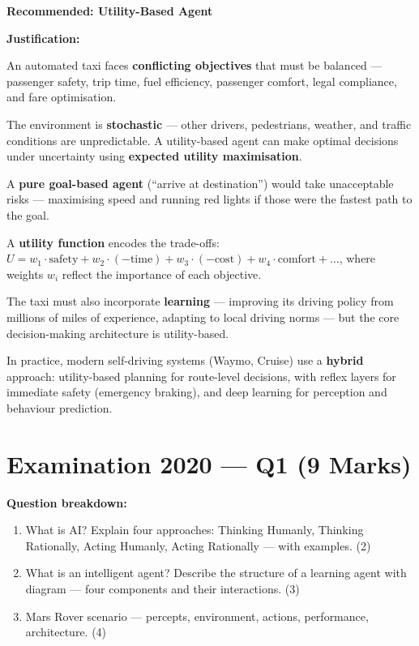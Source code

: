 \documentclass[12pt, a4paper]{article}
\newenvironment{solutionbox}{\begin{mdframed}[style=solutionframe]}{\end{mdframed}}
\newenvironment{answerbox}{\begin{mdframed}[style=answerframe]}{\end{mdframed}}
\begin{document}
\begin{answerbox}
\textbf{Recommended: Utility-Based Agent}

\noindent\textbf{Justification:}
\begin{keypoints}
  \item An automated taxi faces \textbf{conflicting objectives} that must be balanced — passenger safety, trip time, fuel efficiency, passenger comfort, legal compliance, and fare optimisation.
  \item The environment is \textbf{stochastic} — other drivers, pedestrians, weather, and traffic conditions are unpredictable. A utility-based agent can make optimal decisions under uncertainty using \textbf{expected utility maximisation}.
  \item A \textbf{pure goal-based agent} (``arrive at destination'') would take unacceptable risks — maximising speed and running red lights if those were the fastest path to the goal.
  \item A \textbf{utility function} encodes the trade-offs: $U = w_1 \cdot \text{safety} + w_2 \cdot (-\text{time}) + w_3 \cdot (-\text{cost}) + w_4 \cdot \text{comfort} + \ldots$, where weights $w_i$ reflect the importance of each objective.
  \item The taxi must also incorporate \textbf{learning} — improving its driving policy from millions of miles of experience, adapting to local driving norms — but the core decision-making architecture is utility-based.
\end{keypoints}

\noindent In practice, modern self-driving systems (Waymo, Cruise) use a \textbf{hybrid} approach: utility-based planning for route-level decisions, with reflex layers for immediate safety (emergency braking), and deep learning for perception and behaviour prediction.
\end{answerbox}

\newpage

\section{Examination 2020 — Q1 (9 Marks)}

\begin{solutionbox}
\textbf{Question breakdown:}
\begin{enumerate}[noitemsep]
  \item[(a)] What is AI? Explain four approaches: Thinking Humanly, Thinking Rationally, Acting Humanly, Acting Rationally — with examples. (2)
  \item[(b)] What is an intelligent agent? Describe the structure of a learning agent with diagram — four components and their interactions. (3)
  \item[(c)] Mars Rover scenario — percepts, environment, actions, performance, architecture. (4)
\end{enumerate}
\end{solutionbox}
\end{document}
